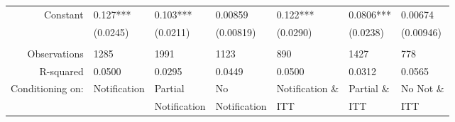 \begin{tabular}{rrrrrrr}
Constant  & \multicolumn{1}{l}{0.127***} & \multicolumn{1}{l}{0.103***} & \multicolumn{1}{l}{0.00859} & \multicolumn{1}{l}{0.122***} & \multicolumn{1}{l}{0.0806***} & \multicolumn{1}{l}{0.00674} \\
      & \multicolumn{1}{l}{(0.0245)} & \multicolumn{1}{l}{(0.0211)} & \multicolumn{1}{l}{(0.00819)} & \multicolumn{1}{l}{(0.0290)} & \multicolumn{1}{l}{(0.0238)} & \multicolumn{1}{l}{(0.00946)} \\
      & \multicolumn{1}{l}{} & \multicolumn{1}{l}{} & \multicolumn{1}{l}{} & \multicolumn{1}{l}{} & \multicolumn{1}{l}{} & \multicolumn{1}{l}{} \\
Observations & \multicolumn{1}{l}{1285} & \multicolumn{1}{l}{1991} & \multicolumn{1}{l}{1123} & \multicolumn{1}{l}{890} & \multicolumn{1}{l}{1427} & \multicolumn{1}{l}{778} \\
R-squared & \multicolumn{1}{l}{0.0500} & \multicolumn{1}{l}{0.0295} & \multicolumn{1}{l}{0.0449} & \multicolumn{1}{l}{0.0500} & \multicolumn{1}{l}{0.0312} & \multicolumn{1}{l}{0.0565} \\
Conditioning on:   & \multicolumn{1}{l}{Notification} & \multicolumn{1}{l}{Partial} & \multicolumn{1}{l}{No  } & \multicolumn{1}{l}{Notification \& } & \multicolumn{1}{l}{Partial \& } & \multicolumn{1}{l}{No Not \&} \\
      & \multicolumn{1}{l}{} & \multicolumn{1}{l}{Notification} & \multicolumn{1}{l}{Notification} & \multicolumn{1}{l}{ITT} & \multicolumn{1}{l}{ITT} & \multicolumn{1}{l}{ITT} \\
\bottomrule
\end{tabular}%
